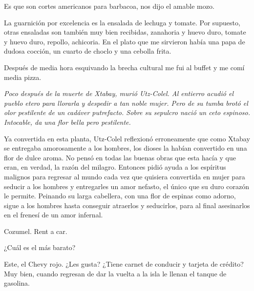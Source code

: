 \documentclass[11pt,twoside,openright,a6paper]{book}
\begin{document}
Es que son cortes americanos para barbacoa, nos dijo el amable mozo.

La guarnición por excelencia es la ensalada de lechuga y tomate. Por
supuesto, otras ensaladas son también muy bien recibidas, zanahoria y huevo
duro, tomate y huevo duro, repollo, achicoria. En el plato que me sirvieron
había una papa de dudosa cocción, un cuarto de choclo y una cebolla frita.

Después de media hora esquivando la brecha cultural me fui al buffet y me
comí media pizza.


\vspace{0.5cm}
\hrulefill\hspace{0.2cm} \decofourleft\decofourright \hspace{0.2cm} \hrulefill
\vspace{0.5cm}

{\em Poco después de la muerte de Xtabay, murió Utz-Colel. Al entierro
acudió el pueblo etero para llorarla y despedir a tan noble mujer. Pero de su
tumba brotó el olor pestilente de un cadáver putrefacto. Sobre su sepulcro
nació un ceto espinoso. Intocable, da una flor bella pero pestilente.

Ya convertida en esta planta, Utz-Colel reflexionó erroneamente que como
Xtabay se entregaba amorosamente a los hombres, los dioses la habían
convertido en una flor de dulce aroma. No pensó en todas las buenas obras
que esta hacía y que eran, en verdad, la razón del milagro. Entonces pidió
ayuda a los espíritus malignos para  regresar al mundo cada vez que quisiera
convertida en mujer para seducir a los hombres y entregarles un amor nefasto,
el único que su duro corazón le permite. Peinando su larga cabellera, con
una flor de espinas como adorno, sigue a los hombres hasta conseguir atraerlos
y seducirlos, para al final asesinarlos en el frenesí de un amor infernal.}


\vspace{0.5cm}
\hrulefill\hspace{0.2cm} \decofourleft\decofourright \hspace{0.2cm} \hrulefill
\vspace{0.5cm}

Cozumel. Rent a car.

¿Cuál es el más barato?

Este, el Chevy rojo. ¿Les gusta? ¿Tiene carnet de conducir y tarjeta de
crédito? Muy bien, cuando regresan de dar la vuelta a la isla le llenan
el tanque de gasolina.
\end{document}
